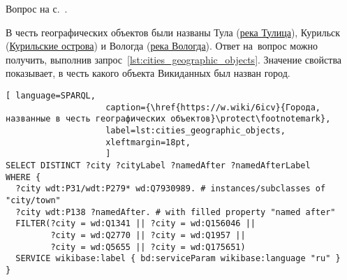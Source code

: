 \hfil{}\hfil%
\begin{task}
    \label{answer:cities_geographic_objects}
    \AnswerBackref Вопрос на с.~\pageref{lst:population_town}.

    В честь географических объектов были названы 
    Тула (\href{https://w.wiki/oLJ}{река Тулица}), 
    Курильск (\href{https://w.wiki/oLH}{Курильские острова}) 
    и Вологда (\href{https://w.wiki/oLG}{река Вологда}). 
    Ответ на~вопрос можно получить, выполнив запрос~\ref{lst:cities_geographic_objects}. 
    Значение свойства  
    показывает, в честь какого объекта Викиданных был назван город.
   
\begin{lstlisting}[ language=SPARQL, 
                    caption={\href{https://w.wiki/6icv}{Города, названные в честь географических объектов}\protect\footnotemark},
                    label=lst:cities_geographic_objects,
                    xleftmargin=18pt, 
                    ]
SELECT DISTINCT ?city ?cityLabel ?namedAfter ?namedAfterLabel 
WHERE {
  ?city wdt:P31/wdt:P279* wd:Q7930989. # instances/subclasses of "city/town" 
  ?city wdt:P138 ?namedAfter. # with filled property "named after"
  FILTER(?city = wd:Q1341 || ?city = wd:Q156046 ||
         ?city = wd:Q2770 || ?city = wd:Q1957 ||
         ?city = wd:Q5655 || ?city = wd:Q175651)
  SERVICE wikibase:label { bd:serviceParam wikibase:language "ru" }
}
\end{lstlisting}%
\end{task}



